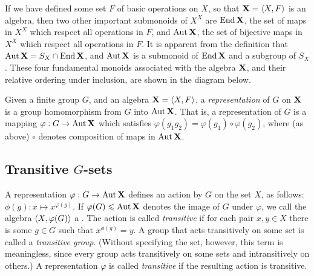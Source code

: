 If we have defined some set $F$ of basic operations on $X$, so that
$\mathbf{X} = \langle X, F\rangle$ is an algebra, then two other important submonoids of
$X^X$ are $\operatorname{End} \mathbf{X}$, the set of maps in $X^X$ which respect all 
operations in $F$, and $\operatorname{Aut} \mathbf{X}$, the set of bijective maps in  $X^X$ which
respect all operations in $F$.  It is apparent from the definition that
$\operatorname{Aut}\mathbf{X}= S_X \cap \operatorname{End} \mathbf{X}$, and  $\operatorname{Aut}\mathbf{X}$ is a submonoid of $\operatorname{End} \mathbf{X}$
and a subgroup of $S_X$.  These four fundamental monoids associated with the
algebra $\mathbf{X}$, and their relative ordering under inclusion, are shown in the diagram
below. 

\begin{center}
\end{center}



Given a finite group $G$, and an algebra $\mathbf{X} = \langle X, F\rangle$, a
%
\emph{representation} of $G$ on $\mathbf{X}$ is a group homomorphism
from $G$ into $\operatorname{Aut}\mathbf{X}$.  That is, a representation of $G$ is a mapping
$\varphi : G \rightarrow \operatorname{Aut}\mathbf{X}$ which satisfies $\varphi(g_1 g_2) =
\varphi(g_1) \circ \varphi(g_2)$, where (as above) $\circ$ denotes composition
of maps in $\operatorname{Aut}\mathbf{X}$.

\subsection{Transitive $G$-sets}
A representation $\varphi : G \rightarrow \operatorname{Aut}\mathbf{X}$ defines an action by $G$ on the
set $X$, as follows: $\phi(g): x \mapsto x^{\varphi(g)}$.  If $\varphi(G) \leqslant
\operatorname{Aut}\mathbf{X}$
denotes the image of $G$ under $\varphi$, we call the algebra $\langle X, \varphi(G)\rangle$
a .
The action is called
%
\emph{transitive} if for each pair $x, y \in X$ there is some $g\in
G$ such that $x^{\phi(g)} = y$. 
A group that acts transitively on some set is called a 
%
\emph{transitive group}.
(Without specifying the set, however, this term is meaningless, since
every group acts transitively on some sets and intransitively on others.)
A representation $\varphi$ is called \emph{transitive} if the resulting action
is transitive. 


